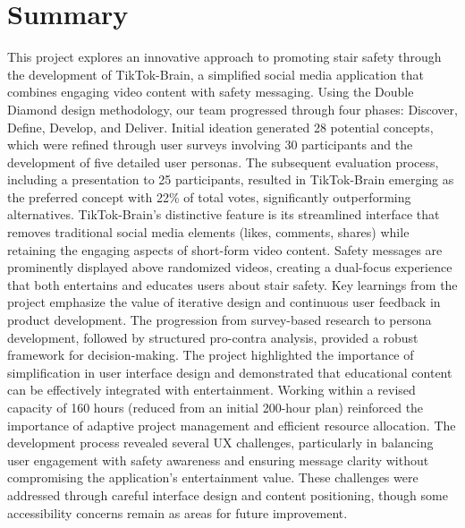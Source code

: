 \documentclass{article}
\begin{document}
\section{Summary}
This project explores an innovative approach to promoting stair safety through the development of TikTok-Brain,
a simplified social media application that combines engaging video content with safety messaging.
Using the Double Diamond design methodology, our team progressed through four phases: Discover, Define, Develop, and Deliver.
Initial ideation generated 28 potential concepts,
which were refined through user surveys involving 30 participants and the development of five detailed user personas.
The subsequent evaluation process, including a presentation to 25 participants,
resulted in TikTok-Brain emerging as the preferred concept with 22\% of total votes, significantly outperforming alternatives.
TikTok-Brain's distinctive feature is its streamlined interface that removes traditional social media elements
(likes, comments, shares) while retaining the engaging aspects of short-form video content.
Safety messages are prominently displayed above randomized videos,
creating a dual-focus experience that both entertains and educates users about stair safety.
Key learnings from the project emphasize the value of iterative design and continuous user feedback in product development.
The progression from survey-based research to persona development,
followed by structured pro-contra analysis, provided a robust framework for decision-making.
The project highlighted the importance of simplification in user interface design
and demonstrated that educational content can be effectively integrated with entertainment.
Working within a revised capacity of 160 hours (reduced from an initial 200-hour plan)
reinforced the importance of adaptive project management and efficient resource allocation.
The development process revealed several UX challenges,
particularly in balancing user engagement with safety awareness and ensuring message clarity
without compromising the application's entertainment value.
These challenges were addressed through careful interface design and content positioning,
though some accessibility concerns remain as areas for future improvement.

\end{document}
